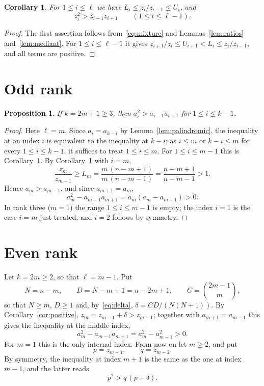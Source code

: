 \documentclass[11pt]{amsart}
\newtheorem{proposition}[theorem]{Proposition}
\newtheorem{corollary}[theorem]{Corollary}
\theoremstyle{definition}
\theoremstyle{remark}
\numberwithin{equation}{section}
\begin{document}
\begin{corollary}\label{cor:lower}
For $1\le i\le\ell$ we have $L_i\le z_i/z_{i-1}\le U_i$, and
\[
z_i^2>z_{i-1}z_{i+1}\qquad(1\le i\le\ell-1).
\]
\end{corollary}

\begin{proof}
The first assertion follows from~\eqref{eq:mixture} and Lemmas~\ref{lem:ratios} and~\ref{lem:mediant}. For $1\le i\le\ell-1$ it gives $z_{i+1}/z_i\le U_{i+1}<L_i\le z_i/z_{i-1}$, and all terms are positive.
\end{proof}

\section{Odd rank}\label{sec:odd}

\begin{proposition}\label{prop:odd}
If $k=2m+1\ge3$, then $a_i^2>a_{i-1}a_{i+1}$ for $1\le i\le k-1$.
\end{proposition}

\begin{proof}
Here $\ell=m$. Since $a_i=a_{k-i}$ by Lemma~\ref{lem:palindromic}, the inequality at an index $i$ is equivalent to the inequality at $k-i$; as $i\le m$ or $k-i\le m$ for every $1\le i\le k-1$, it suffices to treat $1\le i\le m$. For $1\le i\le m-1$ this is Corollary~\ref{cor:lower}. By Corollary~\ref{cor:lower} with $i=m$,
\[
\frac{z_m}{z_{m-1}}\ge L_m=\frac{m\,(n-m+1)}{m\,(n-m-1)}=\frac{n-m+1}{n-m-1}>1 .
\]
Hence $a_m>a_{m-1}$, and since $a_{m+1}=a_m$,
\[
a_m^2-a_{m-1}a_{m+1}=a_m(a_m-a_{m-1})>0 .
\]
In rank three ($m=1$) the range $1\le i\le m-1$ is empty; the index $i=1$ is the case $i=m$ just treated, and $i=2$ follows by symmetry.
\end{proof}

\section{Even rank}\label{sec:even}

Let $k=2m\ge2$, so that $\ell=m-1$. Put
\[
N=n-m,\qquad D=N-m+1=n-2m+1,\qquad C=\binom{2m-1}{m},
\]
so that $N\ge m$, $D\ge1$ and, by~\eqref{eq:delta}, $\delta=CD/(N(N+1))$. By Corollary~\ref{cor:positive}, $z_m=z_{m-1}+\delta>z_{m-1}$; together with $a_{m+1}=a_{m-1}$ this gives the inequality at the middle index,
\begin{equation}\label{eq:middle}
a_m^2-a_{m-1}a_{m+1}=a_m^2-a_{m-1}^2>0 .
\end{equation}
For $m=1$ this is the only internal index. From now on let $m\ge2$, and put
\[
p=z_{m-1},\qquad q=z_{m-2}.
\]
By symmetry, the inequality at index $m+1$ is the same as the one at index $m-1$, and the latter reads
\begin{equation}\label{eq:target}
p^2>q\,(p+\delta).
\end{equation}
\end{document}
